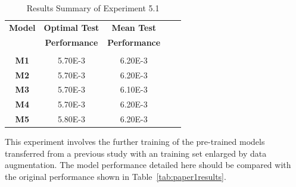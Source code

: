 \begin{table}[h!]
	 \begin{center}
		
		\begin{tabular}{c|c|c|r|c} %
			\textbf{Model} & \textbf{Optimal Test} & \textbf{Mean Test}  \\
			
			\textbf{} & \textbf{Performance} & \textbf{Performance}  \\
			
			\hline
			& & \\
			\textbf{M1} & 5.70E-3 & 6.20E-3 \\
			\textbf{M2} & 5.70E-3 & 6.20E-3 \\
			\textbf{M3} & 5.70E-3 & 6.10E-3 \\
			\textbf{M4} & 5.70E-3 & 6.20E-3 \\
			\textbf{M5} & 5.80E-3 & 6.20E-3 \\
			
			
		\end{tabular}
		\caption{Results Summary of Experiment 5.1} {This experiment involves the further training of the pre-trained models transferred from a previous study with an training set enlarged by data augmentation. The model performance detailed here should be compared with the original performance shown in Table~\ref{tab:paper1results}.  }
		\label{tab:Experiment5p1results}
		 \end{center}
\end{table}

